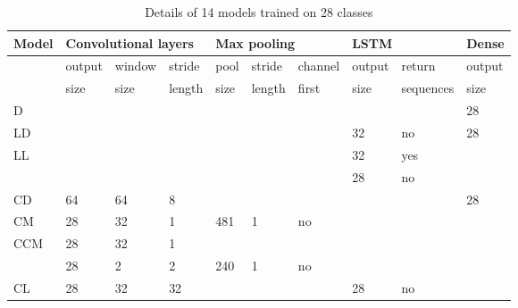 \newcommand{\paint}{\cellcolor{gray!25}}
\begin{table}[!ht]
    \centering
    \footnotesize
    \caption{Details of 14 models trained on 28 classes}
    \label{tab:models}
\begin{tabular}{l||l|l|l||l|l|l||l|l||l}
\hline
Model  & \multicolumn{3}{l||}{Convolutional layers} & \multicolumn{3}{l||}{Max pooling} & \multicolumn{2}{l||}{LSTM} & Dense  \\ \hline
       & output       & window       & stride      & pool    & stride    & channel    & output     & return       & output \\ 
       & size         & size         & length      & size    & length    & first      & size       & sequences    & size   \\ \hline
                                                                                                                              \hline
D      & \paint       & \paint       &     \paint  & \paint  &  \paint   & \paint     & \paint     & \paint       & 28     \\ \hline

LD     & \paint       & \paint       &     \paint  & \paint  &  \paint   & \paint     & 32         & no           & 28     \\ \hline

LL     & \paint       & \paint       &     \paint  & \paint  &  \paint   & \paint     & 32         & yes          & \paint \\ 
       & \paint       & \paint       &     \paint  & \paint  &  \paint   & \paint     & 28         & no           & \paint \\ \hline

CD     & 64           & 64           & 8           & \paint  &  \paint   & \paint     & \paint     & \paint       & 28     \\ \hline

CM     & 28           & 32           & 1           & 481     & 1         & no         &  \paint    & \paint       & \paint \\ \hline

CCM    & 28           & 32           & 1           &         &           &            & \paint     & \paint       & \paint \\ 
       & 28           & 2            & 2           & 240     & 1         & no         & \paint     & \paint       & \paint \\ \hline

CL     & 28           & 32           & 32          & \paint  &  \paint   & \paint     & 28         & no           & \paint \\ \hline


\end{tabular}
\end{table}
